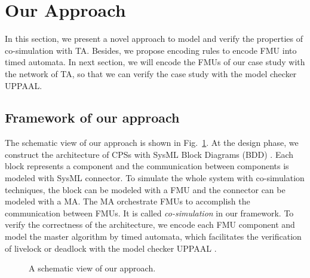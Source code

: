 \section{Our Approach}
In this section, we present a novel approach to model and verify the properties of co-simulation with TA. Besides, we propose encoding rules to encode FMU into timed automata. In next section, we will encode the FMUs of our case study with the network of TA, so that we can verify the case study with the model checker UPPAAL.
\label{sec:encoding}
\subsection{Framework of our approach}
The schematic view of our approach is shown in Fig.~\ref{paper-arc}. At the design phase, we construct the architecture of CPSs with SysML Block Diagrams (BDD) \cite{RahimHI17}. Each block represents a component and the communication between components is modeled with SysML connector. To simulate the whole system with co-simulation techniques, the block can be modeled with a FMU and the connector can be modeled with a MA. The MA orchestrate FMUs to accomplish the communication between FMUs. It is called \textit{co-simulation }in our framework. To verify the correctness of the architecture, we encode each FMU component and model the master algorithm by timed automata, which facilitates the verification of livelock or deadlock with the model checker UPPAAL \cite{BehrmannDLHPYH06}.
\begin{figure}[htbp]
	\caption{A schematic view of our approach.}
	\label{paper-arc}
\end{figure}

